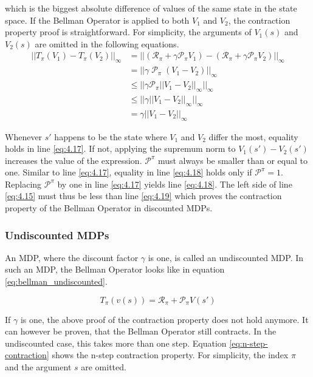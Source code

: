 which is the biggest absolute difference of values of the same state in the state space. If the Bellman Operator is applied to both $V_1$ and $V_2$, the contraction property proof is straightforward. For simplicity, the arguments of $V_1(s)$ and $V_2(s)$ are omitted in the following equations.
\begin{align}
||T_\pi(V_1)-T_\pi(V_2)||_\infty &= ||(\mathcal{R}_\pi+\gamma \mathcal{P}_\pi V_1)-(\mathcal{R}_\pi+\gamma \mathcal{P}_\pi V_2)||_\infty \label{eq:4.15}\\
&=||\gamma\; \mathcal{P}_\pi\;(V_1 - V_2)||_\infty \label{eq:4.16}\\
&\leq ||\gamma \mathcal{P}_\pi ||V_1 - V_2||_\infty ||_\infty \label{eq:4.17} \\
&\leq ||\gamma ||V_1 - V_2||_\infty ||_\infty \label{eq:4.18}\\
&=\gamma ||V_1 - V_2||_\infty \label{eq:4.19}
\end{align} 

Whenever $s'$ happens to be the state where $V_1$ and $V_2$ differ the most, equality holds in line \ref{eq:4.17}. If not, applying the supremum norm to $V_1(s')-V_2(s')$ increases the value of the expression. $\mathcal{P}^\pi$ must always be smaller than or equal to one. Similar to line \ref{eq:4.17}, equality in line \ref{eq:4.18} holds only if $\mathcal{P}^\pi=1$. Replacing $\mathcal{P}^\pi$ by one in line \ref{eq:4.17} yields line \ref{eq:4.18}. The left side of line \ref{eq:4.15} must thus be less than line \ref{eq:4.19} which proves the contraction property of the Bellman Operator in discounted MDPs.

\subsubsection{Undiscounted MDPs}

An MDP, where the discount factor $\gamma$ is one, is called an undiscounted MDP. In such an MDP, the Bellman Operator looks like in equation \ref{eq:bellman_undiscounted}.

\begin{equation}
T_\pi(v(s))=\mathcal{R}_\pi + \mathcal{P}_\pi V(s')
\label{eq:bellman_undiscounted}
\end{equation}

If $\gamma$ is one, the above proof of the contraction property does not hold anymore. It can however be proven, that the Bellman Operator still contracts. In the undiscounted case, this takes more than one step. Equation \ref{eq:n-step-contraction} shows the n-step contraction property. For simplicity, the index $\pi$ and the argument $s$ are omitted.

